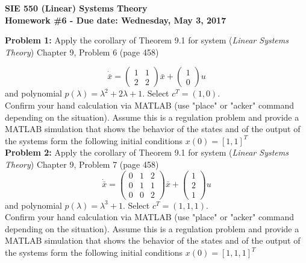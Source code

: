\documentclass[12pt]{article}
\begin{document}
{\centering
 \textbf{SIE 550 (Linear) Systems Theory\\Homework \#6 - Due date: Wednesday, May 3, 2017 \newline}\par
 
} 

\noindent
\textbf{Problem 1:} Apply the corollary of Theorem 9.1 for system ({\em Linear Systems Theory}) Chapter 9, Problem 6 (page 458)
	
$$
\dot{\bar{x}}=
\begin{pmatrix}
	1 & 1 \\
	2 & 2
\end{pmatrix}
\bar{x}+
\begin{pmatrix}
	1 \\
	0
\end{pmatrix} u
$$
and polynomial $p(\lambda)=\lambda^2+2\lambda+1$. Select $c^T=(1, 0)$.\\
Confirm your hand calculation via MATLAB (use "place" or "acker" command depending on the situation). Assume this is a regulation problem and provide a MATLAB simulation that shows the behavior of the states and of the output of the systems form the following initial conditions $x(0)=[1,1]^T$\\

\noindent
\textbf{Problem 2:} Apply the corollary of Theorem 9.1 for system ({\em Linear Systems Theory}) Chapter 9, Problem 7 (page 458)
$$
\dot{\bar{x}}=
\begin{pmatrix}
	0 & 1 & 2 \\
	0 & 1 & 1 \\
	0 & 0 & 2
\end{pmatrix}
\bar{x}+
\begin{pmatrix}
	1 \\
	2 \\
	1
\end{pmatrix} u
$$
and polynomial $p(\lambda)=\lambda^3+1$. Select $c^T=(1, 1, 1)$.\\
Confirm your hand calculation via MATLAB (use "place" or "acker" command depending on the situation). Assume this is a regulation problem and provide a MATLAB simulation that shows the behavior of the states and of the output of the systems form the following initial conditions $x(0)=[1,1,1]^T$\\
\end{document}
